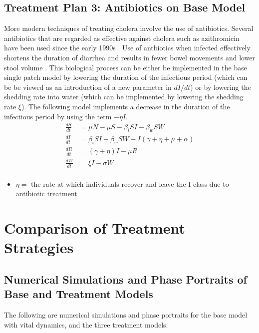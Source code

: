 \documentclass[12pt]{article}\usepackage[]{graphicx}\usepackage[]{color}
\begin{document}
\subsection{Treatment Plan 3: Antibiotics on Base Model}
More modern techniques of treating cholera involve the use of antibiotics. Several antibiotics that are regarded as effective against cholera such as azithromicin have been used since the early 1990s \citep{link23}.
Use of antbiotics when infected effectively shortens the duration of diarrhea and results in fewer bowel movements and lower stool volume \citep{link24}. This biological process can be either be implemented in the base single patch model by lowering the duration of the infectious period (which can be be viewed as an introduction of a new parameter in $dI/dt$) or by lowering the shedding rate into water (which can be implemented by lowering the shedding rate $\xi$).
The following model implements a decrease in the duration of the infectious period by using the term $ - \eta I$.
\begin{align*}
	\frac{dS}{dt}&= \mu N - \mu S - \beta_i SI - \beta_w S W \\
	\frac{dI}{dt}&= \beta_i S I + \beta_w S W - I (\gamma +\eta + \mu + \alpha ) \\
	\frac{dR}{dt}&= (\gamma +\eta)I - \mu R \\
	\frac{dW}{dt}&= \xi I  - \sigma W\\
\end{align*}
\begin{itemize}
	\item $\eta=$ the rate at which individuals recover and leave the I class due to antibiotic treatment
\end{itemize}



\section{Comparison of Treatment Strategies}

\subsection{Numerical Simulations and Phase Portraits of Base and Treatment Models}
The following are numerical simulations and phase portraits for the base model with vital dynamics, and the three treatment models.
\end{document}

